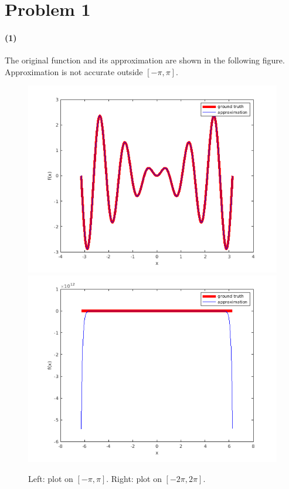 \documentclass[11pt]{report}
\begin{document}
\section*{Problem 1}
\paragraph{(1)} The original function and its approximation are shown in the following figure. Approximation is not accurate outside $[-\pi, \pi]$.
\begin{figure}[h!]
    \centering
    \includegraphics[width=0.49\linewidth]{CS598SMPPL/hw1/1.1.png}
    \includegraphics[width=0.49\linewidth]{CS598SMPPL/hw1/1.1_out.png}
    \caption{Left: plot on $[-\pi, \pi]$. Right: plot on $[-2\pi, 2\pi]$.}
\end{figure}
\end{document}
